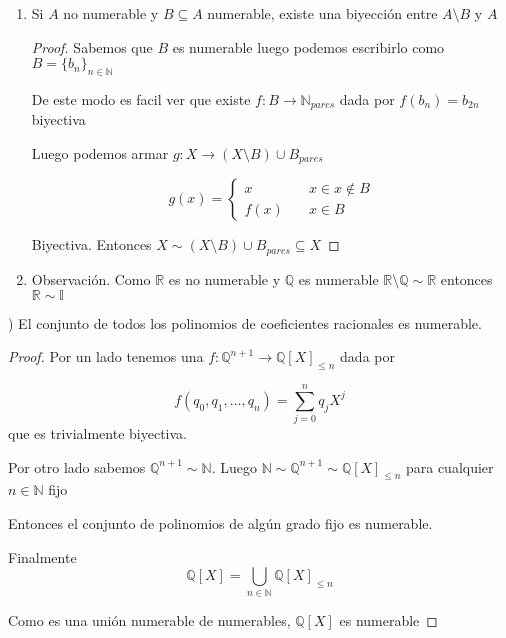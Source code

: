\documentclass[12pt]{article}
\newcommand{\Q}{\mathbb{Q}}
\newcommand{\R}{\mathbb{R}}
\newcommand{\I}{\mathbb{I}}
\newcommand{\N}{\mathbb{N}}
\newcommand{\ra}{\rightarrow}
\theoremstyle{definition}
\begin{document}
\begin{enumerate}[i.]
\begin{enumerate}
\begin{proof}
    Luego tenemos que $$A \cup B = [(A \setminus Y ) \cup Y ] \cup B = (A \setminus Y) \cup (Y \cup B)$$

    Luego como unión de numerables es numerable $Y \cup B \sim Y$

    Juntando todo tenemos

  $$A \cup B = [(A \setminus Y ) \cup Y ] \cup B = (A \setminus Y) \cup (Y \cup B) \sim (A \setminus Y) \cup Y = A$$
\end{proof}

  \item Si $A$ no numerable y $B \subseteq A$ numerable, existe una biyección entre $A \setminus B$ y $A$
    \begin{proof} 
    Sabemos que $B$ es numerable luego podemos escribirlo como $B = \{b_{n}\}_{n \in \N}$ 

    De este modo es facil ver que existe $f:B \ra \N_{pares}$ dada por $f(b_{n}) =b_{2n}$ biyectiva

  Luego podemos armar $g: X \ra (X \setminus B) \cup B_{pares}$

   $$
    g(x) = \left\{
        \begin{array}{ll}
	  x  & \quad x \in x \notin B \\
	  f(x)  & \quad x \in B 
        \end{array}
    \right.
    $$

    Biyectiva. Entonces $ X \sim (X \setminus B) \cup B_{pares} \subseteq X $
  \end{proof}
  \item Observación. Como $\R$ es no numerable y $\Q$ es numerable $\R \setminus \Q \sim \R$ entonces $\R \sim \I$
\end{enumerate}
 
\end{enumerate}
) El conjunto de todos los polinomios de coeficientes racionales es numerable.

\begin{proof}

Por un lado tenemos una $f : \Q^{n+1} \ra \Q[X]_{\leq n}$ dada por

$$ f(q_{0},q_{1}, \dots , q_{n}) = \sum_{j = 0}^{n} q_{j}X^{j}$$ que es trivialmente biyectiva. 

Por otro lado sabemos $\Q^{n+1} \sim \N$. Luego $\N \sim \Q^{n+1} \sim \Q[X]_{\leq n}$ para cualquier $n \in \N$ fijo

Entonces el conjunto de polinomios de algún grado fijo es numerable.

Finalmente $$ \Q[X] = \bigcup_{n \in \N} \Q[X]_{\leq n}$$

Como es una unión numerable de numerables, $\Q[X]$ es numerable

\end{proof}
\end{document}
